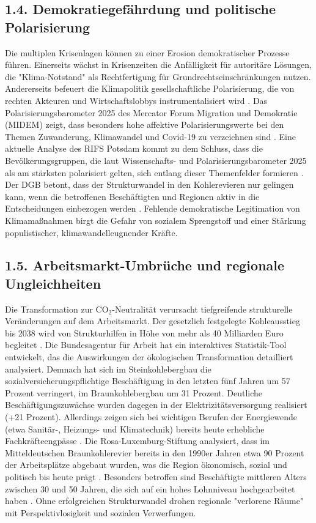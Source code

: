 \documentclass[12pt, a4paper]{article}
\begin{document}
	\subsection*{1.4. Demokratiegefährdung und politische Polarisierung}
	Die multiplen Krisenlagen können zu einer Erosion demokratischer Prozesse führen.
	Einerseits wächst in Krisenzeiten die Anfälligkeit für autoritäre Lösungen, die
	"Klima-Notstand" als Rechtfertigung für Grundrechtseinschränkungen nutzen.
	Andererseits befeuert die Klimapolitik gesellschaftliche Polarisierung, die von
	rechten Akteuren und Wirtschaftslobbys instrumentalisiert wird \cite{westheuser2025}.
	Das Polarisierungsbarometer 2025 des Mercator Forum Migration und Demokratie (MIDEM)
	zeigt, dass besonders hohe affektive Polarisierungswerte bei den Themen Zuwanderung,
	Klimawandel und Covid-19 zu verzeichnen sind \cite{polarisierung2025}.
	Eine aktuelle
	Analyse des RIFS Potsdam kommt zu dem Schluss, dass die Bevölkerungsgruppen, die laut
	Wissenschafts- und Polarisierungsbarometer 2025 als am stärksten polarisiert gelten,
	sich entlang dieser Themenfelder formieren \cite{rifs2025}.
	Der DGB betont, dass der
	Strukturwandel in den Kohlerevieren nur gelingen kann, wenn die betroffenen
	Beschäftigten und Regionen aktiv in die Entscheidungen einbezogen werden \cite{dgb2025}.
	Fehlende demokratische Legitimation von Klimamaßnahmen birgt die Gefahr von sozialem
	Sprengstoff und einer Stärkung populistischer, klimawandelleugnender Kräfte.
	
	\subsection*{1.5. Arbeitsmarkt-Umbrüche und regionale Ungleichheiten}
	Die Transformation zur CO$_2$-Neutralität verursacht tiefgreifende strukturelle
	Veränderungen auf dem Arbeitsmarkt.
	Der gesetzlich festgelegte Kohleausstieg bis
	2038 wird von Strukturhilfen in Höhe von mehr als 40 Milliarden Euro begleitet
	\cite{dgb2025}.
	Die Bundesagentur für Arbeit hat ein interaktives Statistik-Tool
	entwickelt, das die Auswirkungen der ökologischen Transformation detailliert analysiert.
	Demnach hat sich im Steinkohlebergbau die sozialversicherungspflichtige Beschäftigung
	in den letzten fünf Jahren um 57 Prozent verringert, im Braunkohlebergbau um
	31 Prozent.
	Deutliche Beschäftigungszuwächse wurden dagegen in der Elektrizitätsversorgung
	realisiert (+21 Prozent). Allerdings zeigen sich bei wichtigen Berufen der Energiewende
	(etwa Sanitär-, Heizungs- und Klimatechnik) bereits heute erhebliche Fachkräfteengpässe
	\cite{ba2025}.
	Die Rosa-Luxemburg-Stiftung analysiert, dass im Mitteldeutschen
	Braunkohlerevier bereits in den 1990er Jahren etwa 90 Prozent der Arbeitsplätze
	abgebaut wurden, was die Region ökonomisch, sozial und politisch bis heute prägt
	\cite{rosalux2025}.
	Besonders betroffen sind Beschäftigte mittleren Alters zwischen
	30 und 50 Jahren, die sich auf ein hohes Lohnniveau hochgearbeitet haben
	\cite{klimareporter2024}.
	Ohne erfolgreichen Strukturwandel drohen regionale
	"verlorene Räume" mit Perspektivlosigkeit und sozialen Verwerfungen.
	
\end{document}
